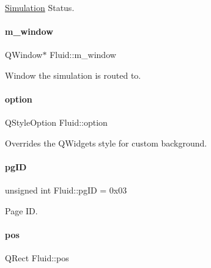 \mbox{\hyperlink{classSimulation}{Simulation}} Status. 

\mbox{\label{classFluid_a138f09aa54f3209e67bf3e0a847bcdbc}} 
\paragraph{\texorpdfstring{m\_window}{m\_window}}
{\footnotesize\ttfamily Q\+Window$\ast$ Fluid\+::m\+\_\+window\hspace{0.3cm}{\ttfamily [private]}}



Window the simulation is routed to. 

\mbox{\label{classFluid_afcdad9ca2270eca892ebe19cc6eb0792}} 
\paragraph{\texorpdfstring{option}{option}}
{\footnotesize\ttfamily Q\+Style\+Option Fluid\+::option\hspace{0.3cm}{\ttfamily [private]}}



Overrides the Q\+Widget\textquotesingle{}s style for custom background. 

\mbox{\label{classFluid_a6a918fd3756b078ac094010cf5215f90}} 
\paragraph{\texorpdfstring{pgID}{pgID}}
{\footnotesize\ttfamily unsigned int Fluid\+::pg\+ID = 0x03}



Page ID. 

\mbox{\label{classFluid_acc8b08224f3d6ee3a6d662c27562e1ab}} 
\paragraph{\texorpdfstring{pos}{pos}}
{\footnotesize\ttfamily Q\+Rect Fluid\+::pos\hspace{0.3cm}{\ttfamily [private]}}



